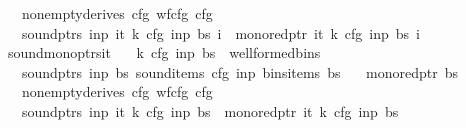 \begin{isabellebody}
\ \ \ {\isachardoublequoteopen}nonempty{\isacharunderscore}{\kern0pt}derives\ cfg{\isachardoublequoteclose}\ {\isachardoublequoteopen}wf{\isacharunderscore}{\kern0pt}cfg\ cfg{\isachardoublequoteclose}\isanewline
\ \ \ {\isachardoublequoteopen}sound{\isacharunderscore}{\kern0pt}ptrs\ inp\ {\isacharparenleft}{\kern0pt}{\isasympi}{\isacharunderscore}{\kern0pt}it{\isacharprime}{\kern0pt}\ k\ cfg\ inp\ bs\ i{\isacharparenright}{\kern0pt}\ {\isasymand}\ mono{\isacharunderscore}{\kern0pt}red{\isacharunderscore}{\kern0pt}ptr\ {\isacharparenleft}{\kern0pt}{\isasympi}{\isacharunderscore}{\kern0pt}it{\isacharprime}{\kern0pt}\ k\ cfg\ inp\ bs\ i{\isacharparenright}{\kern0pt}{\isachardoublequoteclose}%
\isadelimproof
%
\endisadelimproof
%
\isatagproof
%
\endisatagproof
{\isafoldproof}%
%
\isadelimproof
\isanewline
%
\endisadelimproof
{}\isamarkupfalse%
\ sound{\isacharunderscore}{\kern0pt}mono{\isacharunderscore}{\kern0pt}ptrs{\isacharunderscore}{\kern0pt}{\isasympi}{\isacharunderscore}{\kern0pt}it{\isacharcolon}{\kern0pt}\isanewline
\ \ \ {\isachardoublequoteopen}{\isacharparenleft}{\kern0pt}k{\isacharcomma}{\kern0pt}\ cfg{\isacharcomma}{\kern0pt}\ inp{\isacharcomma}{\kern0pt}\ bs{\isacharparenright}{\kern0pt}\ {\isasymin}\ wellformed{\isacharunderscore}{\kern0pt}bins{\isachardoublequoteclose}\isanewline
\ \ \ {\isachardoublequoteopen}sound{\isacharunderscore}{\kern0pt}ptrs\ inp\ bs{\isachardoublequoteclose}\ {\isachardoublequoteopen}sound{\isacharunderscore}{\kern0pt}items\ cfg\ inp\ {\isacharparenleft}{\kern0pt}bins{\isacharunderscore}{\kern0pt}items\ bs{\isacharparenright}{\kern0pt}{\isachardoublequoteclose}\isanewline
\ \ \ {\isachardoublequoteopen}mono{\isacharunderscore}{\kern0pt}red{\isacharunderscore}{\kern0pt}ptr\ bs{\isachardoublequoteclose}\isanewline
\ \ \ {\isachardoublequoteopen}nonempty{\isacharunderscore}{\kern0pt}derives\ cfg{\isachardoublequoteclose}\ {\isachardoublequoteopen}wf{\isacharunderscore}{\kern0pt}cfg\ cfg{\isachardoublequoteclose}\isanewline
\ \ \ {\isachardoublequoteopen}sound{\isacharunderscore}{\kern0pt}ptrs\ inp\ {\isacharparenleft}{\kern0pt}{\isasympi}{\isacharunderscore}{\kern0pt}it\ k\ cfg\ inp\ bs{\isacharparenright}{\kern0pt}\ {\isasymand}\ mono{\isacharunderscore}{\kern0pt}red{\isacharunderscore}{\kern0pt}ptr\ {\isacharparenleft}{\kern0pt}{\isasympi}{\isacharunderscore}{\kern0pt}it\ k\ cfg\ inp\ bs{\isacharparenright}{\kern0pt}{\isachardoublequoteclose}%
\isadelimproof
%
\endisadelimproof

\end{isabellebody}
